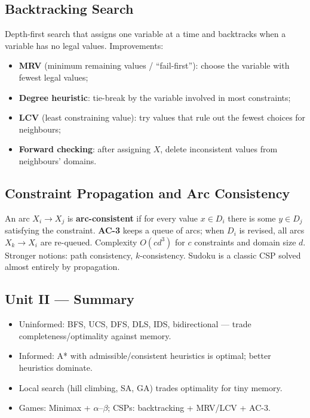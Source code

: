 \subsection{Backtracking Search}
Depth-first search that assigns one variable at a time and backtracks when a variable has no legal values. Improvements:
\begin{itemize}
\item \textbf{MRV} (minimum remaining values / ``fail-first''): choose the variable with fewest legal values;
\item \textbf{Degree heuristic}: tie-break by the variable involved in most constraints;
\item \textbf{LCV} (least constraining value): try values that rule out the fewest choices for neighbours;
\item \textbf{Forward checking}: after assigning $X$, delete inconsistent values from neighbours' domains.
\end{itemize}

\subsection{Constraint Propagation and Arc Consistency}
An arc $X_i\to X_j$ is \textbf{arc-consistent} if for every value $x\in D_i$ there is some $y\in D_j$ satisfying the constraint. \textbf{AC-3} keeps a queue of arcs; when $D_i$ is revised, all arcs $X_k\to X_i$ are re-queued. Complexity $O(cd^{3})$ for $c$ constraints and domain size $d$. Stronger notions: path consistency, $k$-consistency. Sudoku is a classic CSP solved almost entirely by propagation.

\subsection*{Unit II --- Summary}
\begin{itemize}
\item Uninformed: BFS, UCS, DFS, DLS, IDS, bidirectional --- trade completeness/optimality against memory.
\item Informed: A* with admissible/consistent heuristics is optimal; better heuristics dominate.
\item Local search (hill climbing, SA, GA) trades optimality for tiny memory.
\item Games: Minimax + $\alpha$--$\beta$; CSPs: backtracking + MRV/LCV + AC-3.
\end{itemize}




